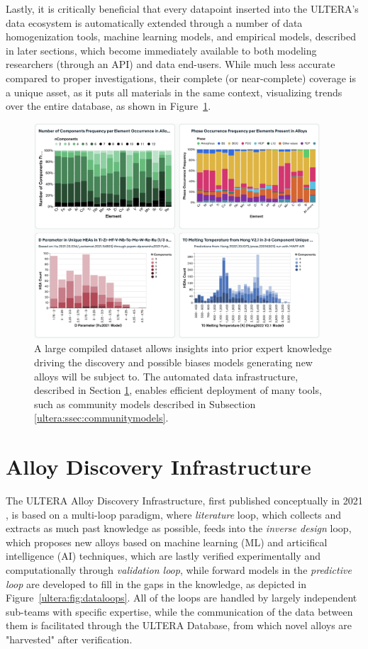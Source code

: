 Lastly, it is critically beneficial that every datapoint inserted into the ULTERA's data ecosystem is automatically extended through a number of data homogenization tools, machine learning models, and empirical models, described in later sections, which become immediately available to both modeling researchers (through an API) and data end-users. While much less accurate compared to proper investigations, their complete (or near-complete) coverage is a unique asset, as it puts all materials in the same context, visualizing trends over the entire database, as shown in Figure~\ref{ultera:fig:insights}.

\begin{figure}[H]
    \centering
    \includegraphics[width=0.95\textwidth]{ultera/ULTERA_Insights.png}
    \caption{A large compiled dataset allows insights into prior expert knowledge driving the discovery and possible biases models generating new alloys will be subject to. The automated data infrastructure, described in Section \ref{ultera:sec:infrastructure}, enables efficient deployment of many tools, such as community models described in Subsection \ref{ultera:ssec:communitymodels}.}
    \label{ultera:fig:insights}
\end{figure}


\section{Alloy Discovery Infrastructure} \label{ultera:sec:infrastructure}

The ULTERA Alloy Discovery Infrastructure, first published conceptually in 2021 \cite{Debnath2021GenerativeAlloys}, is based on a multi-loop paradigm, where \emph{literature} loop, which collects and extracts as much past knowledge as possible, feeds into the \emph{inverse design} loop, which proposes new alloys based on machine learning (ML) and articifical intelligence (AI) techniques, which are lastly verified experimentally and computationally through \emph{validation loop}, while forward models in the \emph{predictive loop} are developed to fill in the gaps in the knowledge, as depicted in Figure~\ref{ultera:fig:dataloops}. All of the loops are handled by largely independent sub-teams with specific expertise, while the communication of the data between them is facilitated through the ULTERA Database, from which novel alloys are "harvested" after verification.

